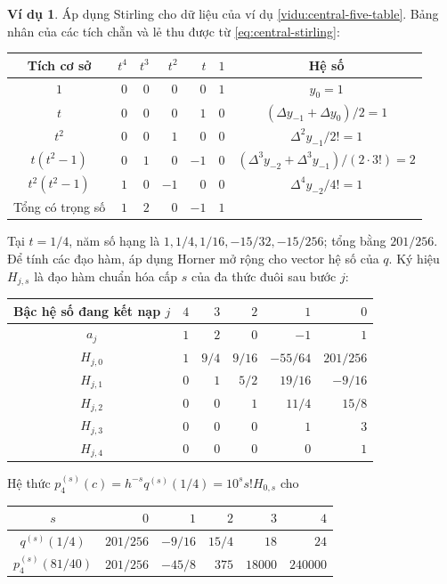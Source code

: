 \documentclass[12pt,a4paper,oneside]{book}
\numberwithin{algorithm}{chapter}
\theoremstyle{definition}
\newtheorem{vidu}{Ví dụ}[chapter]
\begin{document}
\begin{vidu}
Áp dụng Stirling cho dữ liệu của ví dụ \ref{vidu:central-five-table}. Bảng nhân của các tích chẵn và lẻ thu được từ \eqref{eq:central-stirling}:
\begin{center}
\small
\begin{tabular}{c|rrrrr|c}\toprule
Tích cơ sở&$t^4$&$t^3$&$t^2$&$t$&$1$&Hệ số\\\midrule
$1$&$0$&$0$&$0$&$0$&$1$&$y_0=1$\\
$t$&$0$&$0$&$0$&$1$&$0$&$(\Delta y_{-1}+\Delta y_0)/2=1$\\
$t^2$&$0$&$0$&$1$&$0$&$0$&$\Delta^2y_{-1}/2!=1$\\
$t(t^2-1)$&$0$&$1$&$0$&$-1$&$0$&$(\Delta^3y_{-2}+\Delta^3y_{-1})/(2\cdot3!)=2$\\
$t^2(t^2-1)$&$1$&$0$&$-1$&$0$&$0$&$\Delta^4y_{-2}/4!=1$\\\midrule
Tổng có trọng số&$1$&$2$&$0$&$-1$&$1$&\\\bottomrule
\end{tabular}
\end{center}
Tại $t=1/4$, năm số hạng là $1,1/4,1/16,-15/32,-15/256$; tổng bằng $201/256$. Để tính các đạo hàm, áp dụng Horner mở rộng cho vector hệ số của $q$. Ký hiệu $H_{j,s}$ là đạo hàm chuẩn hóa cấp $s$ của đa thức đuôi sau bước $j$:
\begin{center}
\begin{tabular}{c|rrrrr}\toprule
Bậc hệ số đang kết nạp $j$&$4$&$3$&$2$&$1$&$0$\\\midrule
$a_j$&$1$&$2$&$0$&$-1$&$1$\\
$H_{j,0}$&$1$&$9/4$&$9/16$&$-55/64$&$201/256$\\
$H_{j,1}$&$0$&$1$&$5/2$&$19/16$&$-9/16$\\
$H_{j,2}$&$0$&$0$&$1$&$11/4$&$15/8$\\
$H_{j,3}$&$0$&$0$&$0$&$1$&$3$\\
$H_{j,4}$&$0$&$0$&$0$&$0$&$1$\\\bottomrule
\end{tabular}
\end{center}
Hệ thức $p_4^{(s)}(c)=h^{-s}q^{(s)}(1/4)=10^s s!H_{0,s}$ cho
\begin{center}
\begin{tabular}{c|rrrrr}\toprule
$s$&$0$&$1$&$2$&$3$&$4$\\\midrule
$q^{(s)}(1/4)$&$201/256$&$-9/16$&$15/4$&$18$&$24$\\
$p_4^{(s)}(81/40)$&$201/256$&$-45/8$&$375$&$18000$&$240000$\\\bottomrule
\end{tabular}
\end{center}
\end{vidu}
\end{document}
